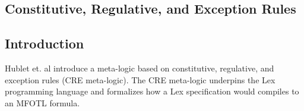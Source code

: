 


\subsection{Constitutive, Regulative, and Exception Rules}
\label{section:cre-meta-logic}

\subsection{Introduction}
\label{subsection:cre-meta-logic}
Hublet et. al \cite{lex} introduce a meta-logic based on
constitutive, regulative, and exception rules (CRE meta-logic).
The CRE meta-logic underpins the Lex programming language
and formalizes how a Lex specification would compiles
to an MFOTL formula.

